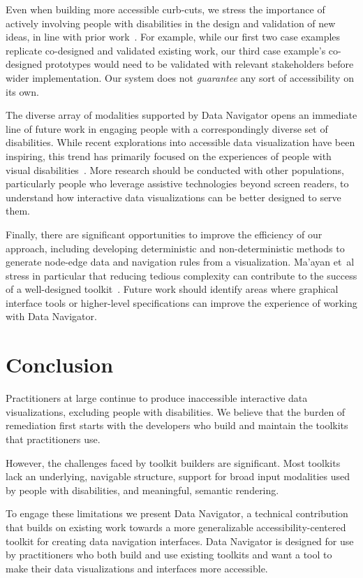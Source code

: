 \documentclass[12pt]{cmuthesis}
\newcommand{\ea}{{et~al\xperiod}\xspace}
\begin{document}
Even when building more accessible curb-cuts, we stress the importance of actively involving people with disabilities in the design and validation of new ideas, in line with prior work~\cite{Reid2022Curb,Lundgard2019Sociotechnical,Lundgard2022Accessible,Zong2022Rich}. For example, while our first two case examples replicate co-designed and validated existing work, our third case example's co-designed prototypes would need to be validated with relevant stakeholders before wider implementation. Our system does not \textit{guarantee} any sort of accessibility on its own.

The diverse array of modalities supported by Data Navigator opens an immediate line of future work in engaging people with a correspondingly diverse set of disabilities. While recent explorations into accessible data visualization have been inspiring, this trend has primarily focused on the experiences of people with visual disabilities~\cite{Elavsky2022Chartability,Marriott,Kim2021Accessible}. More research should be conducted with other populations, particularly people who leverage assistive technologies beyond screen readers, to understand how interactive data visualizations can be better designed to serve them.

Finally, there are significant opportunities to improve the efficiency of our approach, including developing deterministic and non-deterministic methods to generate node-edge data and navigation rules from a visualization. Ma'ayan \ea stress in particular that reducing tedious complexity can contribute to the success of a well-designed toolkit~\cite{Maayan2020Domain}. Future work should identify areas where graphical interface tools or higher-level specifications can improve the experience of working with Data Navigator.

\section{Conclusion}
Practitioners at large continue to produce inaccessible interactive data visualizations, excluding people with disabilities. We believe that the burden of remediation first starts with the developers who build and maintain the toolkits that practitioners use.

However, the challenges faced by toolkit builders are significant. Most toolkits lack an underlying, navigable structure, support for broad input modalities used by people with disabilities, and meaningful, semantic rendering.

To engage these limitations we present Data Navigator, a technical contribution that builds on existing work towards a more generalizable accessibility-centered toolkit for creating data navigation interfaces. Data Navigator is designed for use by practitioners who both build and use existing toolkits and want a tool to make their data visualizations and interfaces more accessible.
\end{document}
